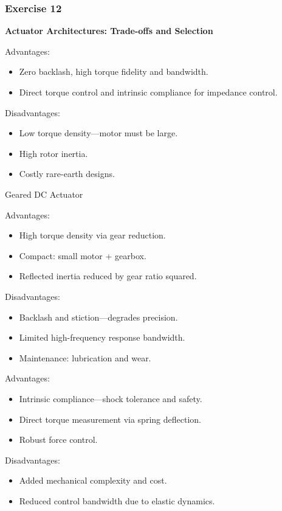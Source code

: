 \documentclass[12pt,a4paper]{article}
\begin{document}
\subsubsection*{Exercise 12}
\textbf{Actuator Architectures: Trade-offs and Selection}


Advantages:
\begin{itemize}
  \item Zero backlash, high torque fidelity and bandwidth.
  \item Direct torque control and intrinsic compliance for impedance control.
\end{itemize}

Disadvantages:
\begin{itemize}
  \item Low torque density—motor must be large.
  \item High rotor inertia.
  \item Costly rare-earth designs.
\end{itemize}


Geared DC Actuator

Advantages:
\begin{itemize}
  \item High torque density via gear reduction.
  \item Compact: small motor + gearbox.
  \item Reflected inertia reduced by gear ratio squared.
\end{itemize}
Disadvantages:
\begin{itemize}
  \item Backlash and stiction—degrades precision.
  \item Limited high-frequency response bandwidth.
  \item Maintenance: lubrication and wear.
\end{itemize}


Advantages:
\begin{itemize}
  \item Intrinsic compliance—shock tolerance and safety.
  \item Direct torque measurement via spring deflection.
  \item Robust force control.
\end{itemize}
Disadvantages:
\begin{itemize}
  \item Added mechanical complexity and cost.
  \item Reduced control bandwidth due to elastic dynamics.
\end{itemize}
\end{document}
